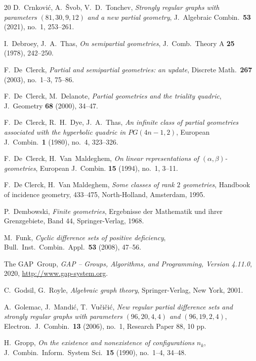 \documentclass[12pt, reqno]{amsart}
\begin{document}
\begin{thebibliography}{20}
D.~Crnkovi\'{c}, A.~\v{S}vob, V.~D.~Tonchev, \emph{Strongly regular
graphs with parameters $(81,30,9,12)$ and a new partial geometry},
J.\ Algebraic Combin.\ \textbf{53} (2021), no.~1, 253--261.

I.~Debroey, J.~A.~Thas, \emph{On semipartial geometries}, J.\ Comb.\
Theory A \textbf{25} (1978), 242--250.

F.~De~Clerck, \emph{Partial and semipartial geometries: an update},
Discrete Math.\ \textbf{267} (2003), no.\ 1--3, 75--86.

F.~De~Clerck, M.~Delanote, \emph{Partial geometries and the triality
quadric}, J.\ Geometry \textbf{68} (2000), 34--47.

F.~De~Clerck, R.~H.~Dye, J.~A.~Thas, \emph{An infinite class of partial
geometries associated with the hyperbolic quadric in $PG(4n-1,2)$},
European J.\ Combin.\ \textbf{1} (1980), no.\ 4, 323--326.

F.~De~Clerck, H.~Van~Maldeghem, \emph{On linear representations of $(\alpha,\beta)$-geometries},
European J.\ Combin. \textbf{15} (1994), no.\ 1, 3--11.

F.~De Clerck, H.~Van Maldeghem, \emph{Some classes of rank $2$
geometries}, Handbook of incidence geometry, 433--475,
North-Holland, Amsterdam, 1995.

P.~Dembowski, \emph{Finite geometries}, Ergebnisse der Mathematik und
ihrer Grenzgebiete, Band 44, Springer-Verlag, 1968.

M.~Funk, \emph{Cyclic difference sets of positive deficiency},
Bull.\ Inst.\ Combin.\ Appl.\ \textbf{53} (2008), 47--56.

The GAP~Group,
\emph{GAP -- Groups, Algorithms, and Programming, Version 4.11.0},
2020, \url{http://www.gap-system.org}.

C.~Godsil, G.~Royle, \emph{Algebraic graph theory}, Springer-Verlag,
New York, 2001.

A.~Golemac, J.~Mandi\'{c}, T.~Vu\v{c}i\v{c}i\'{c}, \emph{New regular partial
difference sets and strongly regular graphs with parameters
$(96,20,4,4)$ and $(96,19,2,4)$}, Electron.\ J.\ Combin.\
\textbf{13} (2006), no.\ 1, Research Paper 88, 10 pp.

H.~Gropp, \emph{On the existence and nonexistence of configurations $n_k$},
J.\ Combin.\ Inform.\ System Sci.\ \textbf{15} (1990), no.\ 1--4, 34--48.


\end{thebibliography}
\end{document}
